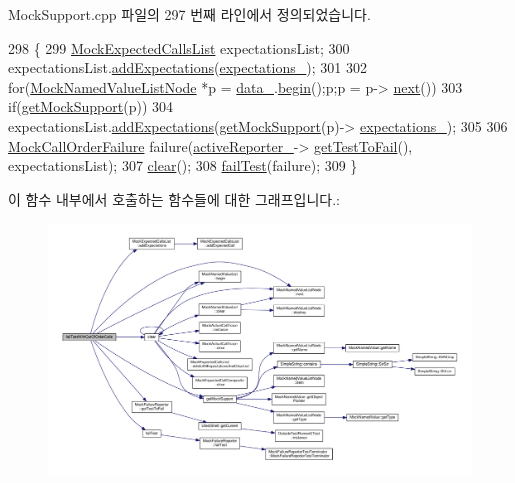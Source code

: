 Mock\+Support.\+cpp 파일의 297 번째 라인에서 정의되었습니다.


\begin{DoxyCode}
298 \{
299     \hyperlink{class_mock_expected_calls_list}{MockExpectedCallsList} expectationsList;
300     expectationsList.\hyperlink{class_mock_expected_calls_list_a391840ec7f7c5cef242747f126ce4484}{addExpectations}(\hyperlink{class_mock_support_a8f02a0b866ff54bef3fb38cd8bc57fa2}{expectations\_});
301 
302     \textcolor{keywordflow}{for}(\hyperlink{class_mock_named_value_list_node}{MockNamedValueListNode} *p = \hyperlink{class_mock_support_a26b06d2d43a7804c9aa5808409c0c1ee}{data\_}.\hyperlink{class_mock_named_value_list_a4a5976d05542385eb64ea73eee7fc59c}{begin}();p;p = p->
      \hyperlink{class_mock_named_value_list_node_adaf0ca3232d35f7efae1bade86b8027e}{next}())
303         \textcolor{keywordflow}{if}(\hyperlink{class_mock_support_a575951d416e49f54fd1a3fc4823609e3}{getMockSupport}(p))
304             expectationsList.\hyperlink{class_mock_expected_calls_list_a391840ec7f7c5cef242747f126ce4484}{addExpectations}(\hyperlink{class_mock_support_a575951d416e49f54fd1a3fc4823609e3}{getMockSupport}(p)->
      \hyperlink{class_mock_support_a8f02a0b866ff54bef3fb38cd8bc57fa2}{expectations\_});
305 
306     \hyperlink{class_mock_call_order_failure}{MockCallOrderFailure} failure(\hyperlink{class_mock_support_a75833f9457ebccff4c6e8b55529313fb}{activeReporter\_}->
      \hyperlink{class_mock_failure_reporter_ae3f75fac53b4d3395e02ee8eca858422}{getTestToFail}(), expectationsList);
307     \hyperlink{class_mock_support_ac8bb3912a3ce86b15842e79d0b421204}{clear}();
308     \hyperlink{class_mock_support_a569bf29b3fe0256d75f48c288e4a4085}{failTest}(failure);
309 \}
\end{DoxyCode}


이 함수 내부에서 호출하는 함수들에 대한 그래프입니다.\+:
\nopagebreak
\begin{figure}[H]
\begin{center}
\leavevmode
\includegraphics[width=350pt]{class_mock_support_ac2e23964ac5bc99117629d22524a4ce3_cgraph}
\end{center}
\end{figure}




